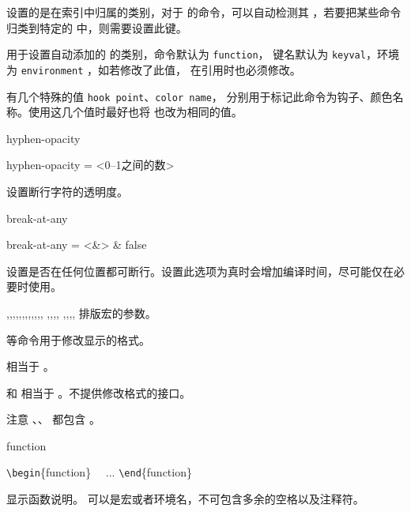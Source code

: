 \documentclass{cusdoc}
\begin{document}
 设置的是在索引中归属的类别，对于 \LaTeXiii 的命令，可以自动检测其 
，若要把某些命令归类到特定的  中，则需要设置此键。

 用于设置自动添加的  的类别，命令默认为 \texttt{function}，
键名默认为 \texttt{keyval}，环境为 \texttt{environment} ，如若修改了此值，
在引用时也必须修改。

 有几个特殊的值 \verb*|hook point|、\verb*|color name|，
分别用于标记此命令为钩子、颜色名称。使用这几个值时最好也将  也改为相同的值。

\begin{keyval}[path=doc/cmd]{hyphen-opacity}
  \begin{syntax}
    hyphen-opacity = <{0--1之间的数}>
  \end{syntax}
设置断行字符的透明度。
\end{keyval}

\begin{keyval}[path=doc/cmd]{break-at-any}
  \begin{syntax}
    break-at-any = <&\TTF> & false 
  \end{syntax}
设置是否在任何位置都可断行。设置此选项为真时会增加编译时间，尽可能仅在必要时使用。
\end{keyval}

\begin{function}{\meta,\veta,\marg,\Arg,\oarg,\parg,\pkg,\env,\cls,\opt,\file,\docfile,
  \cus@doc@meta@format,\cus@doc@veta@format,\cus@doc@marg@format,\cus@doc@oarg@format,
  \cus@doc@parg@format,\cus@doc@pkg@format,\cus@doc@env@format,\cus@doc@cls@format,\cus@doc@opt@format} 
排版宏的参数。

 等命令用于修改显示的格式。

 相当于 。

 和  相当于 。不提供修改格式的接口。

注意 、、 都包含 。
\end{function}

\begin{function}[type=environment]{function}
\begin{syntax}
  \verb|\begin|\{function\}  
  ~~... 
  \verb|\end|\{function\}
\end{syntax}
显示函数说明。 可以是宏或者环境名，不可包含多余的空格以及注释符。
\end{function}
\end{document}
